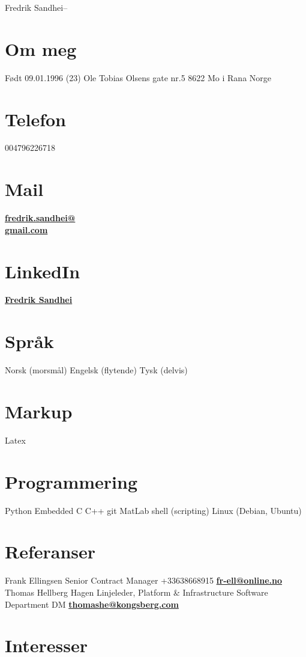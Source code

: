 \documentclass[]{friggeri-cv}
\begin{document}
       {Fredrik Sandhei}--

\begin{aside}
  \section{Om meg}
    Født 09.01.1996 (23)
    Ole Tobias Olsens gate nr.5 
    8622 Mo i Rana
    Norge
  \section{Telefon}
    004796226718
  \section{Mail}
    \href{mailto:fredrik.sandhei@gmail.com}{\textbf{fredrik.sandhei@\\gmail.com}}   
  \section{LinkedIn}
  	\href{https://www.linkedin.com/in/fredrik-sandhei-7738b617a/}{\textbf{Fredrik Sandhei}}
  \section{Språk}
    Norsk (morsmål)
    Engelsk (flytende)
    Tysk (delvis)  
  \section{Markup}
  	Latex
  \section{Programmering}
    Python
    Embedded C
    C++
    git
    MatLab
    shell (scripting)
    Linux (Debian, Ubuntu)  
  \section{Referanser}
    Frank Ellingsen
    Senior Contract Manager
    +33\hspace{0.1cm}638668915
    \href{mailto:fr-ell@online.no}{\textbf{fr-ell@online.no}}
    Thomas Hellberg Hagen
    Linjeleder, Platform \& Infrastructure
    Software Department DM    
    \href{mailto:thomashe@kongsberg.com}{\textbf{thomashe@kongsberg.com}}
\end{aside}

\section{Interesser}
\end{document}
